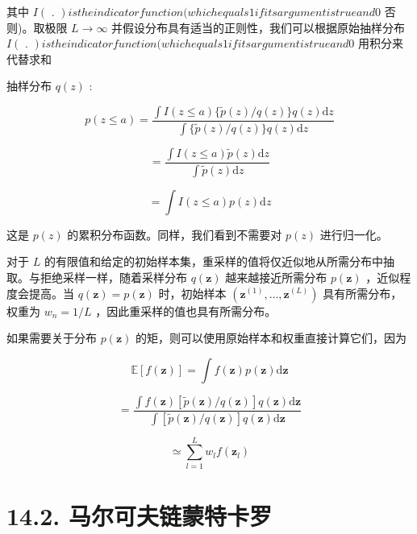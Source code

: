 \documentclass[10pt]{report}
\begin{document}
其中 \(I\left( \text{ . }\right) {istheindicatorfunction}({whichequals1ifitsargumentistrueand0}\) 否则)。取极限 \(L \rightarrow  \infty\) 并假设分布具有适当的正则性，我们可以根据原始抽样分布 \(I\left( \text{ . }\right) {istheindicatorfunction}({whichequals1ifitsargumentistrueand0}\) 用积分来代替求和

抽样分布 \(q\left( z\right)\) :

\[
p\left( {z \leq  a}\right)  = \frac{\int I\left( {z \leq  a}\right) \{ \widetilde{p}\left( z\right) /q\left( z\right) \} q\left( z\right) \mathrm{d}z}{\int \{ \widetilde{p}\left( z\right) /q\left( z\right) \} q\left( z\right) \mathrm{d}z}
\]

\[
= \frac{\int I\left( {z \leq  a}\right) \widetilde{p}\left( z\right) \mathrm{d}z}{\int \widetilde{p}\left( z\right) \mathrm{d}z}
\]

\[
= \int I\left( {z \leq  a}\right) p\left( z\right) \mathrm{d}z \tag{14.25}
\]

这是 \(p\left( z\right)\) 的累积分布函数。同样，我们看到不需要对 \(p\left( z\right)\) 进行归一化。

对于 \(L\) 的有限值和给定的初始样本集，重采样的值将仅近似地从所需分布中抽取。与拒绝采样一样，随着采样分布 \(q\left( \mathbf{z}\right)\) 越来越接近所需分布 \(p\left( \mathbf{z}\right)\) ，近似程度会提高。当 \(q\left( \mathbf{z}\right)  = p\left( \mathbf{z}\right)\) 时，初始样本 \(\left( {{\mathbf{z}}^{\left( 1\right) },\ldots ,{\mathbf{z}}^{\left( L\right) }}\right)\) 具有所需分布，权重为 \({w}_{n} = 1/L\) ，因此重采样的值也具有所需分布。

如果需要关于分布 \(p\left( \mathbf{z}\right)\) 的矩，则可以使用原始样本和权重直接计算它们，因为

\[
\mathbb{E}\left\lbrack  {f\left( \mathbf{z}\right) }\right\rbrack   = \int f\left( \mathbf{z}\right) p\left( \mathbf{z}\right) \mathrm{d}\mathbf{z}
\]

\[
= \frac{\int f\left( \mathbf{z}\right) \left\lbrack  {\widetilde{p}\left( \mathbf{z}\right) /q\left( \mathbf{z}\right) }\right\rbrack  q\left( \mathbf{z}\right) \mathrm{d}\mathbf{z}}{\int \left\lbrack  {\widetilde{p}\left( \mathbf{z}\right) /q\left( \mathbf{z}\right) }\right\rbrack  q\left( \mathbf{z}\right) \mathrm{d}\mathbf{z}}
\]

\[
\simeq  \mathop{\sum }\limits_{{l = 1}}^{L}{w}_{l}f\left( {\mathbf{z}}_{l}\right)  \tag{14.26}
\]

\section*{14.2. 马尔可夫链蒙特卡罗}
\end{document}
